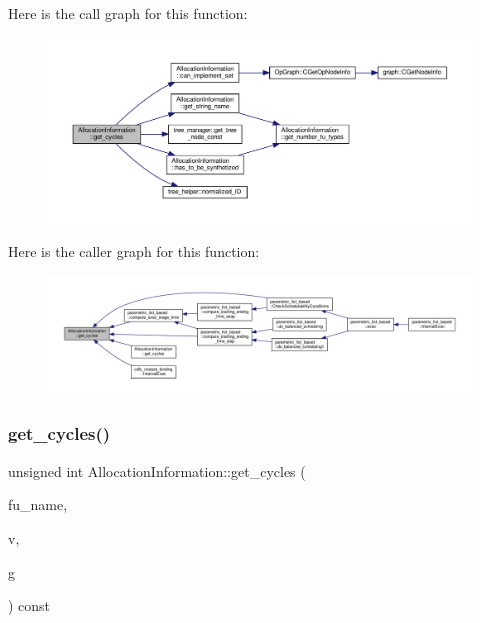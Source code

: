 Here is the call graph for this function\+:
\nopagebreak
\begin{figure}[H]
\begin{center}
\leavevmode
\includegraphics[width=350pt]{d7/d79/classAllocationInformation_a2ca79a1058c4e5a05ce0cd409a35e561_cgraph}
\end{center}
\end{figure}
Here is the caller graph for this function\+:
\nopagebreak
\begin{figure}[H]
\begin{center}
\leavevmode
\includegraphics[width=350pt]{d7/d79/classAllocationInformation_a2ca79a1058c4e5a05ce0cd409a35e561_icgraph}
\end{center}
\end{figure}
\mbox{\label{classAllocationInformation_a27fb75577efef8e25dd62117e745a0a0}} 
\subsubsection{\texorpdfstring{get\+\_\+cycles()}{get\_cycles()}\hspace{0.1cm}{\footnotesize\ttfamily [2/2]}}
{\footnotesize\ttfamily unsigned int Allocation\+Information\+::get\+\_\+cycles (\begin{DoxyParamCaption}\item[{const unsigned int}]{fu\+\_\+name,  }\item[{const \hyperlink{graph_8hpp_abefdcf0544e601805af44eca032cca14}{vertex}}]{v,  }\item[{const \hyperlink{op__graph_8hpp_a9a0b240622c47584bee6951a6f5de746}{Op\+Graph\+Const\+Ref}}]{g }\end{DoxyParamCaption}) const}



